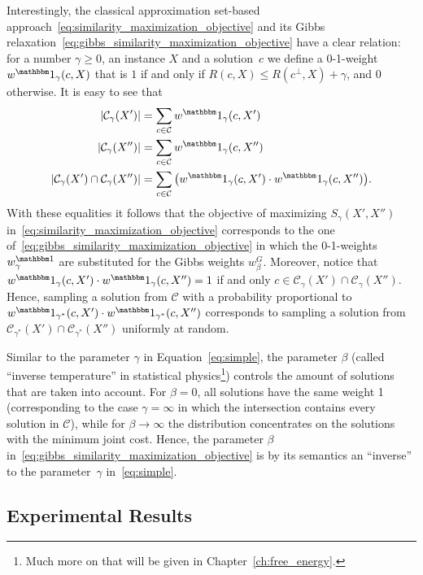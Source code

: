 Interestingly, the classical approximation set-based
approach~\eqref{eq:similarity_maximization_objective} and its Gibbs
relaxation~\eqref{eq:gibbs_similarity_maximization_objective} have a clear
relation: for a number $\gamma\ge 0$, an instance $X$ and a solution~$c$ we
define a 0-1-weight $w^\Ind_\gamma(c, X)$ that is $1$ if and only if $R(c,
X)\le R(c^\perp,X) +
\gamma$, and 0 otherwise. It is easy to see that
\begin{align}
  \label{eq:approximation_set_sum}
  |{\mathcal{C}_\gamma}(X')| &= \sum_{c\in\mathcal{C}} w^\Ind_\gamma(c, X')  \notag \\
  |{\mathcal{C}_\gamma}(X'')| &= \sum_{c\in\mathcal{C}} w^\Ind_\gamma(c, X'') \notag \\
  |{\mathcal{C}_\gamma}(X')\cap {\mathcal{C}_\gamma}(X'')| &= \sum_{c\in\mathcal{C}}
    \big(w^\Ind_\gamma(c,X')\cdot w^\Ind_\gamma(c,X'')\big).
\end{align}
%
With these equalities it follows that the objective of maximizing
$S_\gamma(X',X'')$ in~\eqref{eq:similarity_maximization_objective} corresponds
to the one of~\eqref{eq:gibbs_similarity_maximization_objective} in which the
0-1-weights $w^{\Ind}_\gamma$ are substituted for the Gibbs weights $w^G_\beta$.
%
Moreover, notice that $w^\Ind_\gamma(c,X')\cdot w^\Ind_\gamma(c,X'')=1$ if
and only $c\in {\mathcal{C}_\gamma}(X')\cap {\mathcal{C}_\gamma}(X'')$. Hence, sampling a solution from
$\mathcal{C}$ with a probability proportional to $w^\Ind_{\gamma^*}(c,X')
\cdot w^\Ind_{\gamma^*}(c,X'')$ corresponds to sampling a solution from
$\mathcal{C}_{\gamma^*}(X')\cap \mathcal{C}_{\gamma^*}(X'')$ uniformly at random.
%

Similar to the parameter $\gamma$ in Equation~\eqref{eq:simple}, the parameter
$\beta$ (called ``inverse temperature'' in statistical physics\footnote{Much
more on that will be given in Chapter~\ref{ch:free_energy}.}) 
 controls
the amount of solutions that are taken into account. For $\beta=0$, all
solutions have the same weight 1 (corresponding to the case $\gamma=\infty$ in
which the intersection contains every solution in $\mathcal{C}$), while for
$\beta\to \infty$ the distribution concentrates on the solutions with the
minimum joint cost. Hence, the parameter $\beta$
in~\eqref{eq:gibbs_similarity_maximization_objective} is by its semantics an
``inverse'' to the parameter~$\gamma$ in~\eqref{eq:simple}.

\subsection{Experimental Results}
\label{sec:gen_appch_gibbs_experiments}

